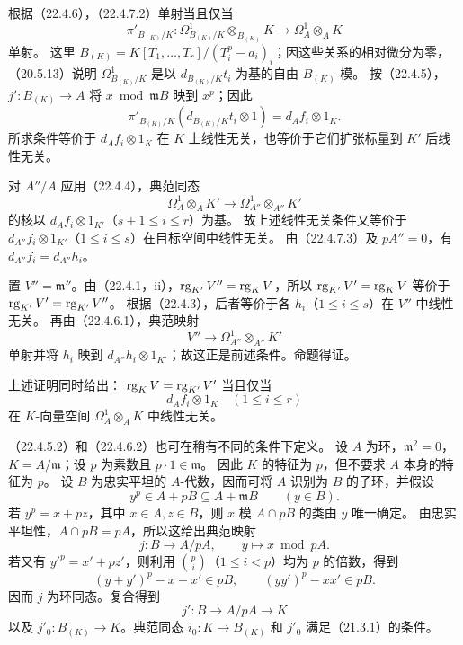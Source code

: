 根据（22.4.6），（22.4.7.2）单射当且仅当
\[
 \pi'_{B_{(K)}/K}:\Omega^1_{B_{(K)}/K}\otimes_{B_{(K)}}K
 \longrightarrow\Omega^1_A\otimes_AK
\]
单射。
这里 $B_{(K)}=K[T_1,\ldots,T_r]/(T_i^p-a_i)_i$；因这些关系的相对微分为零，（20.5.13）说明
$\Omega^1_{B_{(K)}/K}$ 是以 $d_{B_{(K)}/K}t_i$ 为基的自由 $B_{(K)}$-模。
按（22.4.5），$j':B_{(K)}\to A$ 将 $x\bmod\mathfrak mB$ 映到 $x^p$；因此
\[
 \pi'_{B_{(K)}/K}(d_{B_{(K)}/K}t_i\otimes1)=d_Af_i\otimes1_K.
\]
所求条件等价于 $d_Af_i\otimes1_K$ 在 $K$ 上线性无关，也等价于它们扩张标量到 $K'$ 后线性无关。

对 $A''/A$ 应用（22.4.4），典范同态
\[
 \Omega^1_A\otimes_AK'\longrightarrow\Omega^1_{A''}\otimes_{A''}K'
\]
的核以 $d_Af_i\otimes1_{K'}$（$s+1\le i\le r$）为基。
故上述线性无关条件又等价于
$d_{A''}f_i\otimes1_{K'}$（$1\le i\le s$）在目标空间中线性无关。
由（22.4.7.3）及 $pA''=0$，有 $d_{A''}f_i=d_{A''}h_i$。

置 $V''=\mathfrak m''$。由（22.4.1，ii），$\operatorname{rg}_{K'}V''=\operatorname{rg}_KV$，所以
$\operatorname{rg}_{K'}V'=\operatorname{rg}_KV$ 等价于 $\operatorname{rg}_{K'}V'=\operatorname{rg}_{K'}V''$。
根据（22.4.3），后者等价于各 $h_i$（$1\le i\le s$）在 $V''$ 中线性无关。
再由（22.4.6.1），典范映射
\[
 V''\longrightarrow\Omega^1_{A''}\otimes_{A''}K'
\]
单射并将 $h_i$ 映到 $d_{A''}h_i\otimes1_{K'}$；故这正是前述条件。命题得证。
\finishproof

上述证明同时给出：
$\operatorname{rg}_KV=\operatorname{rg}_{K'}V'$ 当且仅当
\[
 d_Af_i\otimes1_K\quad(1\le i\le r)
\]
在 $K$-向量空间 $\Omega^1_A\otimes_AK$ 中线性无关。

（22.4.5.2）和（22.4.6.2）也可在稍有不同的条件下定义。
设 $A$ 为环，$\mathfrak m^2=0$，$K=A/\mathfrak m$；设 $p$ 为素数且 $p\cdot1\in\mathfrak m$。
因此 $K$ 的特征为 $p$，但不要求 $A$ 本身的特征为 $p$。
设 $B$ 为忠实平坦的 $A$-代数，因而可将 $A$ 识别为 $B$ 的子环，并假设
\begin{equation}
 y^p\in A+pB\subseteq A+\mathfrak mB\qquad(y\in B).
 \tag{22.4.8.1}
\end{equation}
若 $y^p=x+pz$，其中 $x\in A,z\in B$，则 $x$ 模 $A\cap pB$ 的类由 $y$ 唯一确定。
由忠实平坦性，$A\cap pB=pA$，所以这给出典范映射
\[
 j:B\longrightarrow A/pA,\qquad y\longmapsto x\bmod pA.
\]
若又有 $y'^p=x'+pz'$，则利用 $\binom pi$（$1\le i<p$）均为 $p$ 的倍数，得到
\[
 (y+y')^p-x-x'\in pB,\qquad(yy')^p-xx'\in pB.
\]
因而 $j$ 为环同态。复合得到
\[
 j':B\longrightarrow A/pA\longrightarrow K
\]
以及 $j'_0:B_{(K)}\to K$。典范同态 $i_0:K\to B_{(K)}$ 和 $j'_0$ 满足（21.3.1）的条件。

